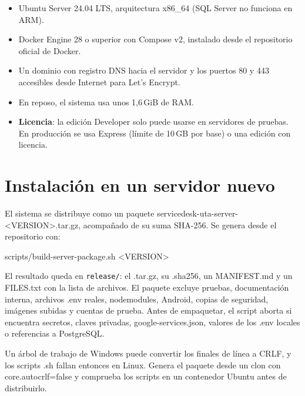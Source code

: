 \documentclass[11pt,a4paper,oneside]{report}
\newcommand{\codus}{\textunderscore\allowbreak}
\DeclareRobustCommand{\cod}[1]{{\small\ttfamily\let\_\codus #1}}
\DeclareRobustCommand{\ruta}[1]{{\small\nolinkurl{#1}}}
\begin{document}
\begin{itemize}
  \item Ubuntu Server 24.04 LTS, arquitectura x86\_64 (SQL Server no funciona en ARM).
  \item Docker Engine 28 o superior con Compose v2, instalado desde el repositorio oficial de Docker.
  \item Un dominio con registro DNS hacia el servidor y los puertos 80 y 443 accesibles desde Internet para Let's Encrypt.
  \item En reposo, el sistema usa unos 1,6\,GiB de RAM.
  \item \textbf{Licencia}: la edición Developer solo puede usarse en servidores de pruebas. En producción se usa
        Express (límite de 10\,GB por base) o una edición con licencia.
\end{itemize}

\chapter{Instalación en un servidor nuevo}\label{cap:instalacion}

El sistema se distribuye como un paquete \cod{servicedesk-uta-server-<VERSION>.tar.gz}, acompañado de su
suma SHA-256. Se genera desde el repositorio con:
\begin{bash}
scripts/build-server-package.sh <VERSION>
\end{bash}
El resultado queda en \ruta{release/}: el \cod{.tar.gz}, su \cod{.sha256}, un \cod{MANIFEST.md} y un
\cod{FILES.txt} con la lista de archivos. El paquete excluye pruebas, documentación interna, archivos
\cod{.env} reales, \cod{node\_modules}, Android, copias de seguridad, imágenes subidas y cuentas de
prueba. Antes de empaquetar, el script aborta si encuentra secretos, claves privadas,
\cod{google-services.json}, valores de los \cod{.env} locales o referencias a PostgreSQL.

\begin{aviso}
Un árbol de trabajo de Windows puede convertir los finales de línea a CRLF, y los scripts \cod{.sh}
fallan entonces en Linux. Genera el paquete desde un clon con \cod{core.autocrlf=false} y comprueba
los scripts en un contenedor Ubuntu antes de distribuirlo.
\end{aviso}
\end{document}
